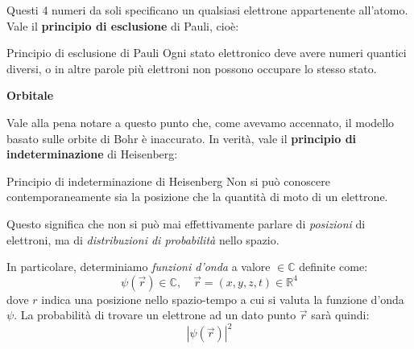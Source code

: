 \documentclass[a4paper,11pt]{article}
\begin{document}
Questi 4 numeri da soli specificano un qualsiasi elettrone appartenente all'atomo.
Vale il \textbf{principio di esclusione} di Pauli, cioè:
\begin{definition}{Principio di esclusione di Pauli}
	Ogni stato elettronico deve avere numeri quantici diversi, o in altre parole più elettroni non possono occupare lo stesso stato.
\end{definition}

\par\smallskip

\noindent
\textbf{\textsf{Orbitale}}

\noindent
Vale alla pena notare a questo punto che, come avevamo accennato, il modello basato sulle orbite di Bohr è inaccurato. In verità, vale il \textbf{principio di indeterminazione} di Heisenberg:

\begin{definition}{Principio di indeterminazione di Heisenberg}
	Non si può conoscere contemporaneamente sia la posizione che la quantità di moto di un elettrone.
\end{definition}

Questo significa che non si può mai effettivamente parlare di \textit{posizioni} di elettroni, ma di \textit{distribuzioni di probabilità} nello spazio.

In particolare, determiniamo \textit{funzioni d'onda} a valore $\in \mathbb{C}$ definite come:
$$
\psi(\vec{r}) \in \mathbb{C}, \quad \vec{r} = (x, y, z, t) \in \mathbb{R}^4
$$
dove $r$ indica una posizione nello spazio-tempo a cui si valuta la funzione d'onda $\psi$.
La probabilità di trovare un elettrone ad un dato punto $\vec{r}$ sarà quindi:
$$
| \psi(\vec{r}) |^2
$$

\par\smallskip
\end{document}
